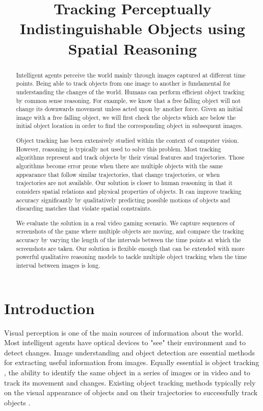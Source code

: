 \documentclass[letterpaper]{article}
\title{Tracking Perceptually Indistinguishable Objects using Spatial Reasoning}
\begin{document}
\maketitle    
\begin{abstract}
Intelligent agents perceive the world mainly through images captured at  different time points. Being able to track objects from one image to another is fundamental for understanding the changes of the world. 
Humans can perform efficient object tracking by common sense reasoning. For example, we know that a free falling object will not change its downwards movement unless acted upon by another force. Given an initial image with a free falling object, we will first check the objects which are below the initial object location in order to find the corresponding object in subsequent images. 

Object tracking has been extensively studied within the context of computer vision. However, reasoning is typically not used to solve this problem. Most tracking algorithms represent and track objects by their visual features and trajectories. Those algorithms become error prone when there are multiple objects with the same appearance that follow similar trajectories, that change trajectories, or when trajectories are not available. Our solution is closer to human reasoning in that it considers spatial relations and physical properties of objects. It can improve tracking accuracy significantly by qualitatively predicting possible motions of objects and discarding matches that violate spatial constraints. 

We evaluate the solution in a real video gaming scenario. We capture sequences of screenshots of the game where multiple objects are moving, and compare the tracking accuracy by varying the length of the intervals between the time points at which the screenshots are taken. Our solution is flexible enough that can be extended with more powerful qualitative reasoning models to tackle multiple object tracking when the time interval between images is long. 
\end{abstract}
\section{Introduction}

Visual perception is one of the main sources of information about the world. Most intelligent agents have optical devices to "see" their environment and to detect changes. Image understanding \cite{sonka1999image,sridhar2011video} and object detection \cite{papageorgiou1998general} are essential methods for extracting useful information from images. Equally essential is object tracking \cite{yilmaz2006object}, the ability to identify the same object in a series of images or in video and to track its movement and changes. Existing object tracking methods typically rely on the visual appearance of objects and on their trajectories to successfully track objects \cite{yilmaz2004contour,cutler2000robust,viola2005detecting}.
\end{document}
